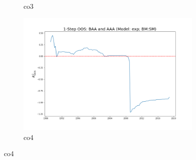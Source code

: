 \documentclass[a4paper,12pt,times,numbered,print,index]{report}
\numberwithin{equation}{section}
\begin{document}
\begin{figure}[!htbp]
\begin{subfigure}[b]{0.42\linewidth}
			\caption{co3}
		\end{subfigure}
		\begin{subfigure}[b]{0.42\linewidth}
			\includegraphics[width=0.9\linewidth]{OOS_plots/exp_co4_SM.png}
			\caption{co4}
		\end{subfigure}
		\label{g6}
	\end{figure}
	
\end{document}
